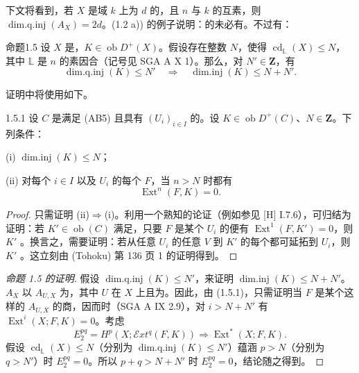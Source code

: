 下文将看到，若 $X$ 是域 $k$ 上为 $d$ 的，且 $n$ 与 $k$ 的互素，则 $\operatorname{dim.q.inj}(A_X)=2d$。(1.2 a)) 的例子说明：的未必有。不过有：

\begin{SGAresult}{命题}{1.5}
设 $X$ 是，$K\in\operatorname{ob}D^+(X)$。假设存在整数 $N$，使得 $\operatorname{cd}_{\mathbb L}(X)\le N$，其中 $\mathbb L$ 是 $n$ 的素因合（记号见 SGA A X 1）。那么，对 $N'\in\mathbf Z$，有
\[
 \operatorname{dim.q.inj}(K)\le N'\quad\Longrightarrow\quad
 \operatorname{dim.inj}(K)\le N+N'.
\]
\end{SGAresult}
证明中将使用如下。

\begin{SGAresult}{}{1.5.1}
设 $C$ 是满足 (AB5) 且具有 $(U_i)_{i\in I}$ 的。设 $K\in\operatorname{ob}D^+(C)$、$N\in\mathbf Z$。下列条件：

(i) $\operatorname{dim.inj}(K)\le N$；

(ii) 对每个 $i\in I$ 以及 $U_i$ 的每个 $F$，当 $n>N$ 时都有
\[
 \operatorname{Ext}^n(F,K)=0.
\]
\end{SGAresult}
\begin{proof}
只需证明 (ii)$\Rightarrow$(i)。利用一个熟知的论证（例如参见 [H] I.7.6），可归结为证明：若 $K'\in\operatorname{ob}(C)$ 满足，只要 $F$ 是某个 $U_i$ 的便有 $\operatorname{Ext}^1(F,K')=0$，则 $K'$ 。换言之，需要证明：若从任意 $U_i$ 的任意 $V$ 到 $K'$ 的每个都可延拓到 $U_i$，则 $K'$ 。这立刻由 (Tohoku) 第 136 页 1 的证明得到。
\end{proof}
\begin{proof}[命题 1.5 的证明]
假设 $\operatorname{dim.q.inj}(K)\le N'$，来证明 $\operatorname{dim.inj}(K)\le N+N'$。$A_X$ 以 $A_{U,X}$ 为，其中 $U$ 在 $X$ 上且为。因此，由 (1.5.1)，只需证明当 $F$ 是某个这样的 $A_{U,X}$ 的商，因而时（SGA A IX 2.9），对 $i>N+N'$ 有 $\operatorname{Ext}^i(X;F,K)=0$。考虑
\[
 E_2^{pq}=H^p(X;\mathcal Ext^q(F,K))\Longrightarrow\operatorname{Ext}^*(X;F,K).
\]
假设 $\operatorname{cd}_{\mathbb L}(X)\le N$（分别为 $\operatorname{dim.q.inj}(K)\le N'$）蕴涵 $p>N$（分别为 $q>N'$）时 $E_2^{pq}=0$。所以 $p+q>N+N'$ 时 $E_2^{pq}=0$，结论随之得到。
\end{proof}

